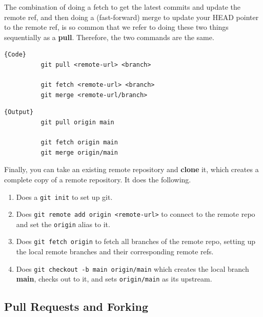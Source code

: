 \documentclass{article}
\begin{document}
    \begin{definition}[Pull]
      The combination of doing a fetch to get the latest commits and update the remote ref, and then doing a (fast-forward) merge to update your HEAD pointer to the remote ref, is so common that we refer to doing these two things sequentially as a \textbf{pull}. Therefore, the two commands are the same. 

      \noindent\begin{minipage}{.5\textwidth}
        \begin{lstlisting}[]{Code}
          git pull <remote-url> <branch> 

          git fetch <remote-url> <branch>  
          git merge <remote-url/branch>
        \end{lstlisting}
        \end{minipage}
        \hfill
        \begin{minipage}{.49\textwidth}
        \begin{lstlisting}[]{Output}
          git pull origin main 

          git fetch origin main 
          git merge origin/main
        \end{lstlisting}
      \end{minipage}
    \end{definition}

    \begin{definition}[Clone]
      Finally, you can take an existing remote repository and \textbf{clone} it, which creates a complete copy of a remote repository. It does the following. 
      \begin{enumerate}
        \item Does a \texttt{git init} to set up git. 
        \item Does \texttt{git remote add origin <remote-url>} to connect to the remote repo and set the \texttt{origin} alias to it. 
        \item Does \texttt{git fetch origin} to fetch all branches of the remote repo, setting up the local remote branches and their corresponding remote refs. 
        \item Does \texttt{git checkout -b main origin/main} which creates the local branch \textbf{main}, checks out to it, and sets \texttt{origin/main} as its upstream. 
      \end{enumerate}
    \end{definition}

  \subsection{Pull Requests and Forking} 
\end{document}
